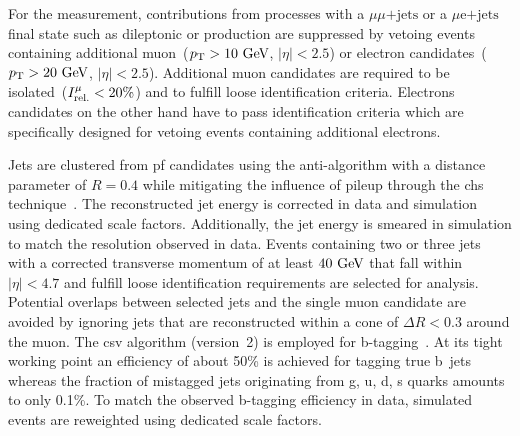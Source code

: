 
For the measurement, contributions from processes with a $\mu\mu\mathrm{\mbox{+}jets}$ or a $\mu\mathrm{e}\mathrm{\mbox{+}jets}$ final state such as dileptonic \ttbar or \zjets production are suppressed by vetoing events containing additional muon~($p_\textrm{T}>10~\textrm{GeV}$, $|\eta|<2.5$) or electron candidates~($p_\textrm{T}>20~\textrm{GeV}$, $|\eta|<2.5$). Additional muon candidates are required to be isolated~($\muiso<20\%$) and to fulfill loose identification criteria. Electrons candidates on the other hand have to pass identification criteria which are specifically designed for vetoing events containing additional electrons.

Jets are clustered from \Gls{pf} candidates using the anti-\kt algorithm with a distance parameter of $R=0.4$ while mitigating the influence of pileup through the \gls{chs} technique~\cite{CMS-PAS-JME-14-001}. The reconstructed jet energy is corrected in data and simulation using dedicated scale factors. Additionally, the jet energy is smeared in simulation to match the resolution observed in data. Events containing two or three jets with a corrected transverse momentum of at least $40~\textrm{GeV}$ that fall within $|\eta|<4.7$ and fulfill loose identification requirements are selected for analysis. Potential overlaps between selected jets and the single muon candidate are avoided by ignoring jets that are reconstructed within a cone of $\Delta R<0.3$ around the muon. The \gls{csv} algorithm (version~2) is employed for b-tagging~\cite{CMS-PAS-BTV-15-001}. At its tight working point an efficiency of about 50\% is achieved for tagging true b~jets whereas the fraction of mistagged jets originating from g, u, d, s quarks amounts to only 0.1\%. To match the observed b-tagging efficiency in data, simulated events are reweighted using dedicated scale factors.

